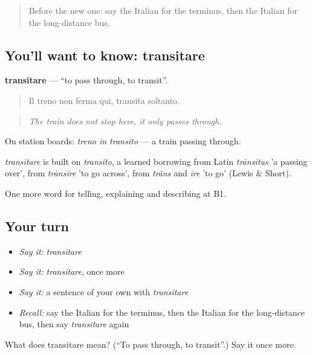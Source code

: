 \label{lesson:IT-C417-transitare}



\begin{quote}
Before the new one: say the Italian for the terminus, then the Italian for the long-distance bus.
\end{quote}

\subsection*{You'll want to know: transitare}
\textbf{transitare} — \textquotedblleft{}to pass through, to transit\textquotedblright{}.

\begin{quote}
Il treno non ferma qui, transita soltanto.
\end{quote}

\begin{quote}
\emph{The train does not stop here, it only passes through.}
\end{quote}

On station boards: \emph{treno in transito} — a train passing through.

\begin{cousinweb}
\emph{transitare} is built on \emph{transito}, a learned borrowing from Latin \emph{trānsitus} 'a passing over', from \emph{trānsīre} 'to go across', from \emph{trāns} and \emph{īre} 'to go' (Lewis \& Short).
\end{cousinweb}

\begin{grammarlens}[title={What you've built}]
One more word for telling, explaining and describing at B1.
\end{grammarlens}

\subsection*{Your turn}
\begin{itemize}
\raggedright
  \item \emph{Say it:} \emph{transitare}
  \item \emph{Say it:} \emph{transitare}, once more
  \item \emph{Say it:} a sentence of your own with \emph{transitare}
  \item \emph{Recall:} say the Italian for the terminus, then the Italian for the long-distance bus, then say \emph{transitare} again
\end{itemize}

\begin{tcolorbox}[breakable,colback=teal!4,colframe=teal!35!black,title={Before you move on}]
What does transitare mean? (\textquotedblleft{}To pass through, to transit\textquotedblright{}.) Say it once more.
\end{tcolorbox}
